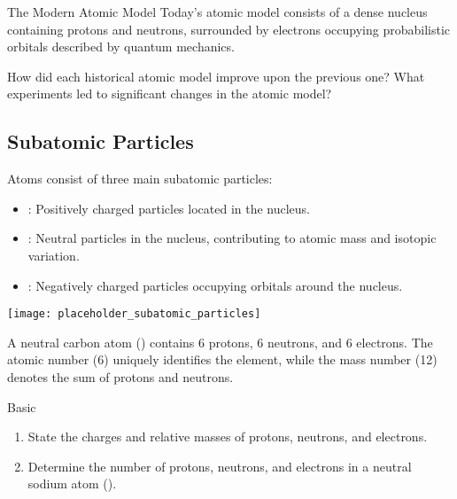 

\begin{keyconcept}{The Modern Atomic Model}
Today's atomic model consists of a dense nucleus containing protons and neutrons, surrounded by electrons occupying probabilistic orbitals described by quantum mechanics.
\end{keyconcept}

\begin{stopandthink}
How did each historical atomic model improve upon the previous one? What experiments led to significant changes in the atomic model?
\end{stopandthink}

\subsection{Subatomic Particles}
\FloatBarrier
\FloatBarrier
\FloatBarrier

Atoms consist of three main subatomic particles:

\begin{itemize}
    \item {}: Positively charged particles located in the nucleus.
    \item {}: Neutral particles in the nucleus, contributing to atomic mass and isotopic variation.
    \item {}: Negatively charged particles occupying orbitals around the nucleus.
\end{itemize}

\begin{marginfigure}[0pt][0pt][0pt]
\texttt{[image: placeholder\_subatomic\_particles]}
\caption{The arrangement of protons, neutrons, and electrons within an atom.}
\label{fig:subatomic_particles}
\end{marginfigure}

\begin{example}
A neutral carbon atom () contains 6 protons, 6 neutrons, and 6 electrons. The atomic number (6) uniquely identifies the element, while the mass number (12) denotes the sum of protons and neutrons.
\end{example}

\begin{tieredquestions}{Basic}
\begin{enumerate}
    \item State the charges and relative masses of protons, neutrons, and electrons.
    \item Determine the number of protons, neutrons, and electrons in a neutral sodium atom ().
\end{enumerate}
\end{tieredquestions}

